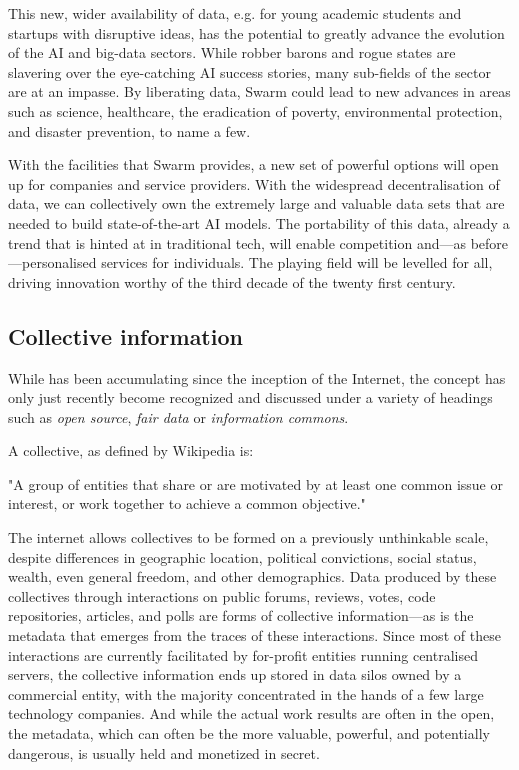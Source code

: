 This new, wider availability of data, e.g. for young academic students and startups with disruptive ideas, has the potential to greatly advance the evolution of the AI and big-data sectors. While robber barons and rogue states are slavering over the eye-catching AI success stories, many sub-fields of the sector are at an impasse. By liberating data, Swarm could lead to new advances in areas such as science, healthcare, the eradication of poverty, environmental protection, and disaster prevention, to name a few. 

With the facilities that Swarm provides, a new set of powerful options will open up for companies and service providers. With the widespread decentralisation of data, we can collectively own the extremely large and valuable data sets that are needed to build state-of-the-art AI models. The portability of this data, already a trend that is hinted at in traditional tech, will enable competition and—as before—personalised services for individuals. The playing field will be levelled for all, driving innovation worthy of the third decade of the  twenty first century. 



\subsection{Collective information \statusgreen}\label{sec:collective_information}

While  has been accumulating since the inception of the Internet, the concept has only just recently become recognized and discussed under a variety of headings such as \emph{open source}, \emph{fair data} or \emph{information commons}.

A collective, as defined by Wikipedia is:
\begin{displayquote}
"A group of entities that share or are motivated by at least one common issue or interest, or work together to achieve a common objective." 
\end{displayquote}
The internet allows collectives to be formed on a previously unthinkable scale, despite differences in geographic location, political convictions, social status, wealth, even general freedom, and other demographics. Data produced by these collectives through interactions on public forums, reviews, votes, code repositories, articles, and polls are forms of collective information—as is the metadata that emerges from the traces of these interactions. Since most of these interactions are currently facilitated by for-profit entities running centralised servers, the collective information ends up stored in data silos owned by a commercial entity, with the majority concentrated in the hands of a few large technology companies. And while the actual work results are often in the open, the metadata, which can often be the more valuable, powerful, and potentially dangerous, is usually held and monetized in secret.

